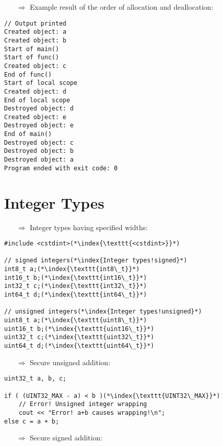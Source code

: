\documentclass[10pt]{book}
\begin{document}
\begin{enumerate}
\item[$\Rightarrow$] Example result of the order of allocation and deallocation:
\end{enumerate}
\begin{lstlisting}
// Output printed
Created object: a
Created object: b
Start of main()
Start of func()
Created object: c
End of func()
Start of local scope
Created object: d
End of local scope
Destroyed object: d
Created object: e
Destroyed object: e
End of main()
Destroyed object: c
Destroyed object: b
Destroyed object: a
Program ended with exit code: 0
\end{lstlisting}
%
%
\section{Integer Types}
\begin{enumerate}
\item[$\Rightarrow$] Integer types having specified widths:
\end{enumerate}
\begin{lstlisting}
#include <cstdint>(*\index{\texttt{<cstdint>}}*)

// signed integers(*\index{Integer types!signed}*)
int8_t a;(*\index{\texttt{int8\_t}}*)
int16_t b;(*\index{\texttt{int16\_t}}*)
int32_t c;(*\index{\texttt{int32\_t}}*)
int64_t d;(*\index{\texttt{int64\_t}}*)

// unsigned integers(*\index{Integer types!unsigned}*)
uint8_t a;(*\index{\texttt{uint8\_t}}*)
uint16_t b;(*\index{\texttt{uint16\_t}}*)
uint32_t c;(*\index{\texttt{uint32\_t}}*)
uint64_t d;(*\index{\texttt{uint64\_t}}*)
\end{lstlisting}
\begin{enumerate}
\item[$\Rightarrow$] Secure unsigned addition:
\end{enumerate}
\begin{lstlisting}
uint32_t a, b, c;

if ( (UINT32_MAX - a) < b )(*\index{\texttt{UINT32\_MAX}}*)
    // Error! Unsigned integer wrapping
    cout << "Error! a+b causes wrapping!\n";
else c = a + b;
\end{lstlisting}
\begin{enumerate}
\item[$\Rightarrow$] Secure signed addition:
\end{enumerate}
\end{document}
